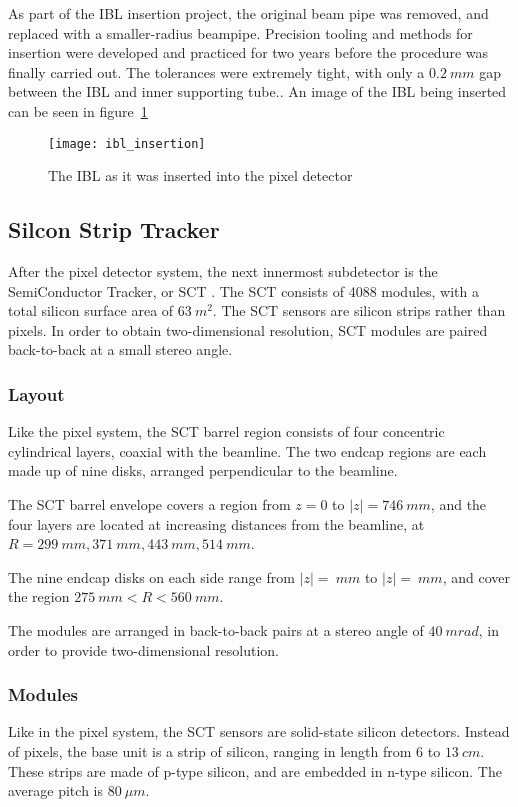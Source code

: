 As part of the IBL insertion project, the original beam pipe was removed, and replaced with a smaller-radius beampipe.
Precision tooling and methods for insertion were developed and practiced for two years before the procedure was finally carried out.
The tolerances were extremely tight, with only a $0.2~mm$ gap between the IBL and inner supporting tube.\cite{ibl-website}.
An image of the IBL being inserted can be seen in figure~\ref{fig:ibl_insertion}

\begin{figure}[!ht]\centering
\texttt{[image: ibl\_insertion]}
\caption{The IBL as it was inserted into the pixel detector}
\label{fig:ibl_insertion}\cite{ibl-website}
\end{figure}

\subsection{Silcon Strip Tracker}\label{subsec:sct}

After the pixel detector system, the next innermost subdetector is the SemiConductor Tracker, or SCT .
The SCT consists of 4088 modules, with a total silicon surface area of $63~m^2$.\cite{atlas-detector-2008}
The SCT sensors are silicon strips rather than pixels.
In order to obtain two-dimensional resolution, SCT modules are paired back-to-back at a small stereo angle.

\subsubsection{Layout}
Like the pixel system, the SCT barrel region consists of four concentric cylindrical layers, coaxial with the beamline.
The two endcap regions are each made up of nine disks, arranged perpendicular to the beamline.

The SCT barrel envelope covers a region from $z = 0$ to $|z|  = 746~mm$,
and the four layers are located at increasing distances from the beamline,
at $R = 299~mm, 371~mm, 443~mm, 514~mm$.\cite{sct-barrel-2006}

The nine endcap disks on each side range from $|z| = ~mm$ to $|z| = ~mm$,
and cover the region $275~mm < R < 560~mm$.\cite{atlas-detector-2008}

The modules are arranged in back-to-back pairs at a stereo angle of $40~mrad$, in order to provide two-dimensional resolution.

\subsubsection{Modules}
Like in the pixel system, the SCT sensors are solid-state silicon detectors.
Instead of pixels, the base unit is a strip of silicon, ranging in length from $6$ to $13~cm$.
These strips are made of p-type silicon, and are embedded in n-type silicon. The average pitch is $80~\mu m$.\cite{sct-2010}

